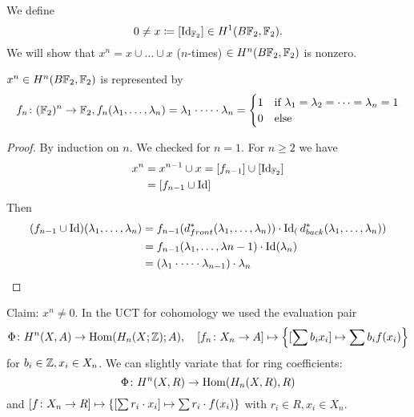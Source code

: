 \documentclass[language=english]{TemplateLecture}
\begin{document}
\begin{example}
    We define
    \[0 \neq x \coloneq [\Id_{\IF_2}] \in H^1(B\IF_2, \IF_2).\]
    We will show that \(x^n = x \cup \dots \cup x\) (\(n\)-times) \(\in H^n(B\IF_2, \IF_2)\) is nonzero.
    \begin{Proposition}
        \(x^n \in H^n(B\IF_2, \IF_2)\) is represented by
        \[f_n \colon (\IF_2)^n \to \IF_2, f_n(\lambda_1, \dots, \lambda_n) = \lambda_1 \cdot \dots \cdot \lambda_n = \begin{cases}
            1 & \text{if } \lambda_1 = \lambda_2 = \dots = \lambda_n = 1 \\
            0 & \text{else}
        \end{cases}\]
    \end{Proposition}
    \begin{proof}
        By induction on \(n\). We checked for \(n = 1\).
        For \(n \geq 2\) we have
        \[\begin{split}
            x^n &= x^{n-1} \cup x = [f_{n-1}] \cup [\Id_{\IF_2}] \\
            &= [f_{n-1} \cup \Id] \\
        \end{split}\]
        Then
        \[\begin{split}
            (f_{n-1} \cup \Id)(\lambda_1 , \dots, \lambda_n) &= f_{n-1}(d_{front}^*(\lambda_1, \dots, \lambda_n)) \cdot \Id_(d_{back}^*(\lambda_1, \dots, \lambda_n)) \\
            &= f_{n-1}(\lambda_1, \dots, \lambda{n-1}) \cdot \Id(\lambda_n) \\
            &= (\lambda_1 \cdot \dots \cdot \lambda_{n-1}) \cdot \lambda_n \\
        \end{split}\]
    \end{proof}

    Claim: \(x^n \neq 0\). In the UCT for cohomology we used the evaluation pair
    \[\Phi\colon H^n(X,A) \to \Hom(H_n(X;\IZ);A), \quad [f_n\colon X_n \to A] \mapsto \set*{[\sum b_ix_i] \mapsto \sum b_i f(x_i)}\]
    for \(b_i \in \IZ, x_i \in X_n\).
    We can slightly variate that for ring coefficients:
    \[\Phi\colon H^n(X,R) \to \Hom(H_n(X,R), R)\]
    and \([f\colon X_n \to R] \mapsto \set{[\sum r_i \cdot x_i] \mapsto \sum r_i \cdot f(x_i)}\) with \(r_i \in R, x_i \in X_n\).


\end{example}
\end{document}
